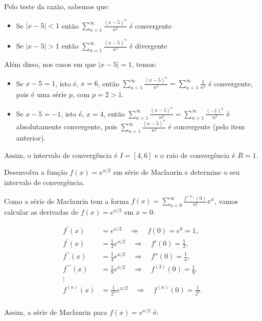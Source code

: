 \documentclass[12pt,a4paper]{article}
\begin{document}
\begin{ExerciseList}
Pelo teste da razão, sabemos que:
\begin{itemize}
    \item Se \(\left| x-5 \right| < 1\) então \(\sum_{n=1}^{\infty} \frac{(x-5)^n}{n^2}\) é convergente
    \item Se \(\left| x-5 \right| > 1\) então \(\sum_{n=1}^{\infty} \frac{(x-5)^n}{n^2}\) é divergente
\end{itemize}
Além disso, nos casos em que \(\left| x-5 \right| = 1\), temos:
\begin{itemize}
    \item Se \(x-5 = 1\), isto é, \(x=6\), então \(\sum_{n=1}^{\infty} \frac{(x-5)^n}{n^2} = \sum_{n=1}^{\infty} \frac{1}{n^2}\) é convergente, pois é uma série $p$, com \(p = 2 > 1\).
    \item Se \(x-5 = -1\), isto é, \(x=4\), então  \(\sum_{n=1}^{\infty} \frac{(x-5)^n}{n^2} = \sum_{n=1}^{\infty} \frac{(-1)^n}{n^2}\) é absolutamente convergente, pois \(\sum_{n=1}^{\infty} \frac{(x-5)^n}{n^2}\) é convergente (pelo item anterior).
\end{itemize}

Assim, o intervalo de convergência é $\boxed{I = [4, 6]}$ e o raio de convergência é \(\boxed{R = 1}\).


\Exercise[title={2,5}] Desenvolva a função \( f(x) = e^{x/2} \) em série de Maclaurin e determine o seu intervalo de convergência.

\Answer Como a série de Maclaurin tem a forma \( f(x) = \sum_{n=0}^{\infty} \frac{f^{(n)}(0)}{n!} x^n \), vamos calcular as derivadas de \( f(x) = e^{x/2} \) em \( x = 0 \):

\begin{align*}
    f^\prime(x) & = e^{x/2} \quad \Rightarrow \quad f(0) = e^0 = 1,\\
    f^\prime(x) & = \frac{1}{2} e^{x/2} \quad \Rightarrow \quad f'(0) = \frac{1}{2},\\
    f^{\prime\prime}(x) & = \frac{1}{4} e^{x/2} \quad \Rightarrow \quad f''(0) = \frac{1}{4},\\
    f^{\prime\prime\prime}(x) & = \frac{1}{8} e^{x/2} \quad \Rightarrow \quad f^{(3)}(0) = \frac{1}{8},\\
    \vdots \\
    f^{(n)}(x) & = \frac{1}{2^n} e^{x/2} \quad \Rightarrow \quad f^{(n)}(0) = \frac{1}{2^n}.\\
\end{align*}

Assim, a série de Maclaurin para \( f(x) = e^{x/2} \) é:


\end{ExerciseList}
\end{document}
